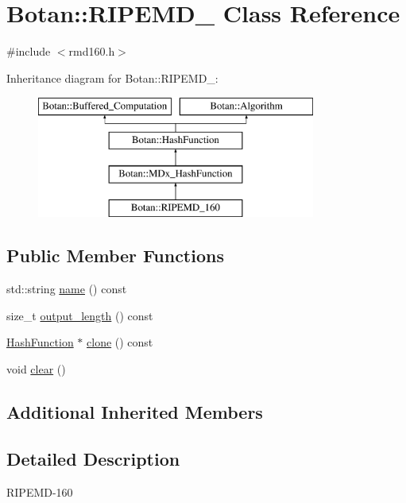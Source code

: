 \hypertarget{classBotan_1_1RIPEMD__160}{\section{Botan\-:\-:R\-I\-P\-E\-M\-D\-\_ Class Reference}
\label{classBotan_1_1RIPEMD__160}
}


{\ttfamily \#include $<$rmd160.\-h$>$}

Inheritance diagram for Botan\-:\-:R\-I\-P\-E\-M\-D\-\_\-:\begin{figure}[H]
\begin{center}
\leavevmode
\includegraphics[height=4.000000cm]{classBotan_1_1RIPEMD__160}
\end{center}
\end{figure}
\subsection*{Public Member Functions}
\begin{DoxyCompactItemize}
\item 
std\-::string \hyperlink{classBotan_1_1RIPEMD__160_a16740c2a11e3095c3c8edf6baeba646a}{name} () const 
\item 
size\-\_\-t \hyperlink{classBotan_1_1RIPEMD__160_a88d7572c83a1219cc58cc9c4dff110a4}{output\-\_\-length} () const 
\item 
\hyperlink{classBotan_1_1HashFunction}{Hash\-Function} $\ast$ \hyperlink{classBotan_1_1RIPEMD__160_a93e5ee0a9eb425f5193cbc8acd60e774}{clone} () const 
\item 
void \hyperlink{classBotan_1_1RIPEMD__160_a0069ab6fb786e451d72f5b806423a7b8}{clear} ()
\end{DoxyCompactItemize}
\subsection*{Additional Inherited Members}


\subsection{Detailed Description}
R\-I\-P\-E\-M\-D-\/160 

